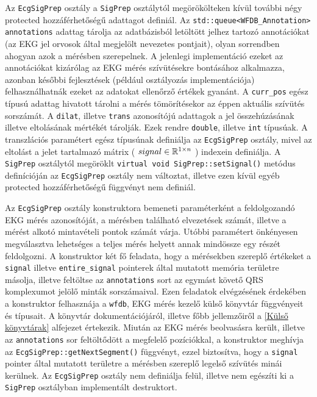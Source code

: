 \documentclass[oneside,titlepage,12pt,a4paper]{report}
\begin{document}
\par Az \texttt{EcgSigPrep} osztály a \texttt{SigPrep} osztálytól megörökölteken kívül további négy protected hozzáférhetőségű adattagot definiál. Az \texttt{std::queue<WFDB\_Annotation> annotations} adattag tárolja az adatbázisból letöltött jelhez tartozó annotációkat (az EKG jel orvosok által megjelölt nevezetes pontjait), olyan sorrendben ahogyan azok a mérésben szerepelnek. A jelenlegi implementáció ezeket az annotációkat kizárólag az EKG mérés szívütésekre bontásához alkalmazza, azonban későbbi fejlesztések (például osztályozás implementációja) felhasználhatnák ezeket az adatokat ellenőrző értékek gyanánt. A \texttt{curr\_pos} egész típusú adattag hivatott tárolni a mérés tömörítésekor az éppen aktuális szívütés sorszámát. A \texttt{dilat}, illetve \texttt{trans} azonosítójú adattagok a jel összehúzásának illetve eltolásának mértékét tárolják. Ezek rendre \texttt{double}, illetve \texttt{int} típusúak. A transzlációs paramétert egész típusúnak definiálja az \texttt{EcgSigPrep} osztály, mivel az eltolást a jelet tartalmazó mátrix ( $ signal \in \Bbb R^{1 \times n} $ ) indexein definiálja. A \texttt{SigPrep} osztálytól megöröklt \texttt{virtual void SigPrep::setSignal()} metódus definícióján az \texttt{EcgSigPrep} osztály nem változtat, illetve ezen kívül egyéb protected hozzáférhetőségű függvényt nem definiál.
\par Az \texttt{EcgSigPrep} osztály konstruktora bemeneti paraméterként a feldolgozandó EKG mérés azonosítóját, a mérésben található elvezetések számát, illetve a mérést alkotó mintavételi pontok számát várja. Utóbbi paramétert önkényesen megválasztva lehetséges a teljes mérés helyett annak mindössze egy részét feldolgozni. A konstruktor két fő feladata, hogy a mérésekben szereplő értékeket a \texttt{signal} illetve \texttt{entire\_signal} pointerek által mutatott memória területre másolja, illetve feltöltse az \texttt{annotations} sort az egymást követő QRS komplexumot jelölő minták sorszámaival. Ezen feladatok elvégzésének érdekében a konstruktor felhasznája a \texttt{wfdb}, EKG mérés kezelő külső könyvtár függvényeit és típusait. A könyvtár dokumentációjáról, illetve főbb jellemzőiről a \ref{Külső könyvtárak} alfejezet értekezik. Miután az EKG mérés beolvasásra került, illetve az \texttt{annotations} sor feltöltődött a megfelelő pozíciókkal, a konstruktor meghívja az \texttt{EcgSigPrep::getNextSegment()} függvényt, ezzel biztosítva, hogy a \texttt{signal} pointer által mutatott területre a mérésben szereplő legelső szívütés minái kerülnek. Az \texttt{EcgSigPrep} osztály nem definiálja felül, illetve nem egészíti ki a \texttt{SigPrep} osztályban implementált destruktort. 
\end{document}
